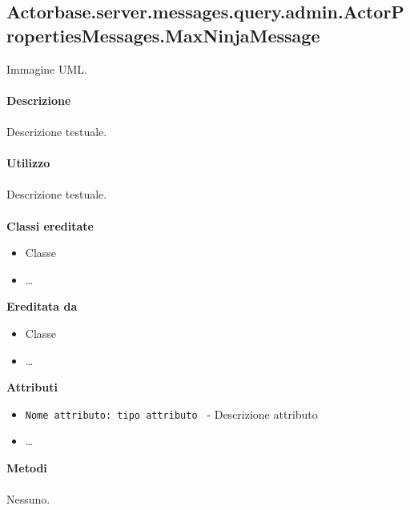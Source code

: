 \documentclass[a4paper]{article}
\begin{document}
\subsection{Actorbase.server.messages.query.admin.ActorPropertiesMessages.MaxNinjaMessage}
		Immagine UML.
		\\ \\
		\textbf{Descrizione}
			\\ \\
			Descrizione testuale.
			\\ \\
		\textbf{Utilizzo}
			\\ \\
			Descrizione testuale.
			\\ \\
		\textbf{Classi ereditate}
			\begin{itemize}
				\item Classe
				\item \dots
			\end{itemize}
		\textbf{Ereditata da}
			\begin{itemize}
				\item Classe
				\item \dots
			\end{itemize}
		\textbf{Attributi}
			\begin{itemize}
				\item \texttt{Nome attributo: tipo attributo } - Descrizione attributo
				\item \dots
			\end{itemize}
		\textbf{Metodi}
			\\ \\
			Nessuno.
			
\end{document}
